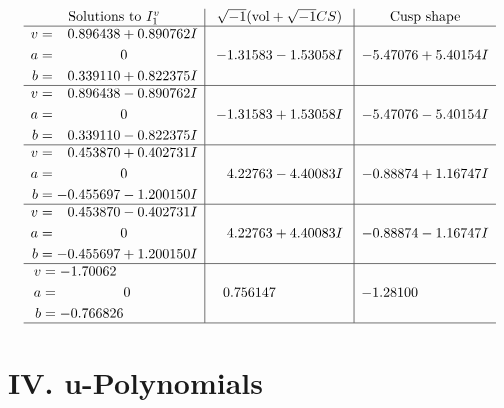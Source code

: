 \documentclass[1p]{elsarticle_modified}
\theoremstyle{definition}
\newcommand{\I}{\sqrt{-1}}
\begin{document}
$$\begin{array}{c|c|c}  
\text{Solutions to }I^v_{1}& \I (\text{vol} + \sqrt{-1}CS) & \text{Cusp shape}\\
 \hline 
\begin{aligned}
v &= \phantom{-}0.896438 + 0.890762 I \\
a &= \phantom{-0.000000 } 0 \\
b &= \phantom{-}0.339110 + 0.822375 I\end{aligned}
 & -1.31583 - 1.53058 I & -5.47076 + 5.40154 I \\ \hline\begin{aligned}
v &= \phantom{-}0.896438 - 0.890762 I \\
a &= \phantom{-0.000000 } 0 \\
b &= \phantom{-}0.339110 - 0.822375 I\end{aligned}
 & -1.31583 + 1.53058 I & -5.47076 - 5.40154 I \\ \hline\begin{aligned}
v &= \phantom{-}0.453870 + 0.402731 I \\
a &= \phantom{-0.000000 } 0 \\
b &= -0.455697 - 1.200150 I\end{aligned}
 & \phantom{-}4.22763 - 4.40083 I & -0.88874 + 1.16747 I \\ \hline\begin{aligned}
v &= \phantom{-}0.453870 - 0.402731 I \\
a &= \phantom{-0.000000 } 0 \\
b &= -0.455697 + 1.200150 I\end{aligned}
 & \phantom{-}4.22763 + 4.40083 I & -0.88874 - 1.16747 I \\ \hline\begin{aligned}
v &= -1.70062\phantom{ +0.000000I} \\
a &= \phantom{-0.000000 } 0 \\
b &= -0.766826\phantom{ +0.000000I}\end{aligned}
 & \phantom{-}0.756147\phantom{ +0.000000I} & -1.28100\phantom{ +0.000000I}\\
 \hline 
 \end{array}$$\newpage
\newpage\renewcommand{\arraystretch}{1}
\centering \section*{ IV. u-Polynomials}
\end{document}
